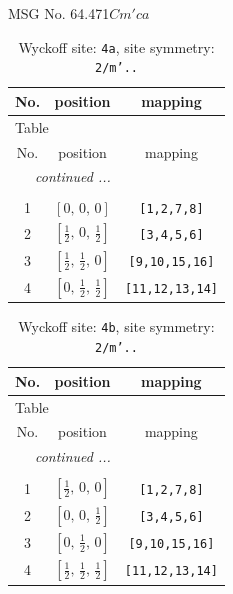 \documentclass[fleqn,8pt]{jsarticle}
\begin{document}
\setcounter{MaxMatrixCols}{32}

\renewcommand{\tablename}{Table~}
\renewcommand{\figurename}{Figure~}
\begin{center}
\LARGE
MSG No. 64.471\quad$Cm'ca$
\end{center}
\renewcommand{\arraystretch}{1.2}
\begin{longtable}{ccc}
\caption{Wyckoff site: {\tt 4a}, site symmetry: {\tt 2/m'..}}
 \\
 \hline \hline
No. & position & mapping \\ \hline \endfirsthead

\multicolumn{2}{l}{\tablename\ \thetable{}} \\
 \hline \hline
No. & position & mapping \\ \hline \endhead

 \hline \hline
\multicolumn{2}{r}{\footnotesize\it continued ...} \\ \endfoot

 \hline \hline
\multicolumn{2}{r}{} \\ \endlastfoot

1 & $\left[ 0,\, 0,\, 0 \right]$ & {\tt [1,2,7,8]} \\ \hline
2 & $\left[ \frac{1}{2},\, 0,\, \frac{1}{2} \right]$ & {\tt [3,4,5,6]} \\ \hline
3 & $\left[ \frac{1}{2},\, \frac{1}{2},\, 0 \right]$ & {\tt [9,10,15,16]} \\ \hline
4 & $\left[ 0,\, \frac{1}{2},\, \frac{1}{2} \right]$ & {\tt [11,12,13,14]} \\
\end{longtable}
\renewcommand{\arraystretch}{1.2}
\begin{longtable}{ccc}
\caption{Wyckoff site: {\tt 4b}, site symmetry: {\tt 2/m'..}}
 \\
 \hline \hline
No. & position & mapping \\ \hline \endfirsthead

\multicolumn{2}{l}{\tablename\ \thetable{}} \\
 \hline \hline
No. & position & mapping \\ \hline \endhead

 \hline \hline
\multicolumn{2}{r}{\footnotesize\it continued ...} \\ \endfoot

 \hline \hline
\multicolumn{2}{r}{} \\ \endlastfoot

1 & $\left[ \frac{1}{2},\, 0,\, 0 \right]$ & {\tt [1,2,7,8]} \\ \hline
2 & $\left[ 0,\, 0,\, \frac{1}{2} \right]$ & {\tt [3,4,5,6]} \\ \hline
3 & $\left[ 0,\, \frac{1}{2},\, 0 \right]$ & {\tt [9,10,15,16]} \\ \hline
4 & $\left[ \frac{1}{2},\, \frac{1}{2},\, \frac{1}{2} \right]$ & {\tt [11,12,13,14]} \\
\end{longtable}
\end{document}
